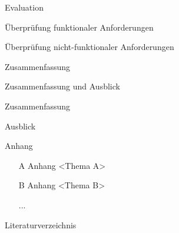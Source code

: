 \documentclass[11pt]{scrartcl}
\begin{document}
\begin{gliederung}
	\item Evaluation
	\begin{gliederung}
		\item Überprüfung funktionaler Anforderungen
		\item Überprüfung nicht-funktionaler Anforderungen
		\item Zusammenfassung
	\end{gliederung}

	\item Zusammenfassung und Ausblick
	\begin{gliederung}
		\item Zusammenfassung
		\item Ausblick
	\end{gliederung}

\end{gliederung}

{\parindent=5mm
Anhang}
\begin{itemize}%
\item[A] Anhang <Thema A>
\item[B] Anhang <Thema B>
\item[...]
\end{itemize}

{\parindent=5mm
Literaturverzeichnis}%
\medskip    %
\end{document}
